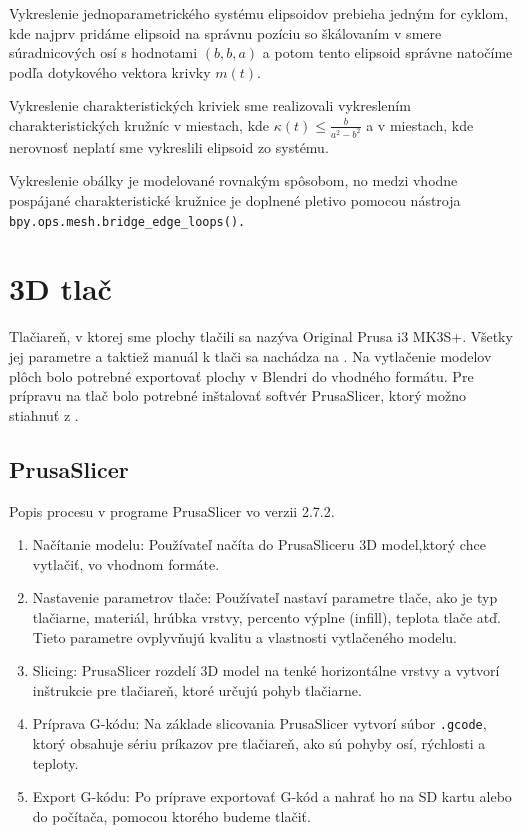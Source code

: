 Vykreslenie jednoparametrického systému elipsoidov prebieha jedným for cyklom, kde najprv pridáme elipsoid na správnu pozíciu so škálovaním v smere súradnicových osí s hodnotami $(b, b, a)$ a potom tento elipsoid správne natočíme podľa dotykového vektora krivky $m(t).$  

Vykreslenie charakteristických kriviek sme realizovali vykreslením charakteristických kružníc v miestach, kde
$\kappa(t) \leq \frac{b}{a^2-b^2}$ a v miestach, kde nerovnosť neplatí sme vykreslili elipsoid zo systému.

Vykreslenie obálky je modelované rovnakým spôsobom, no medzi vhodne pospájané charakteristické kružnice je doplnené pletivo pomocou nástroja \verb|bpy.ops.mesh.bridge_edge_loops().|  

\section{3D tlač}
Tlačiareň, v ktorej sme plochy tlačili sa nazýva Original Prusa i3 MK3S+. Všetky jej parametre a taktiež manuál k tlači sa nachádza na \cite{PrusaManual}. Na vytlačenie modelov plôch bolo potrebné exportovať plochy v Blendri do vhodného formátu. Pre prípravu na tlač bolo potrebné inštalovať softvér PrusaSlicer, ktorý možno stiahnuť z \cite{PrusaSlicer}.
\subsection{PrusaSlicer}
Popis procesu v programe PrusaSlicer vo verzii 2.7.2.
\begin{enumerate}
\item Načítanie modelu: Používateľ načíta do PrusaSliceru 3D model,ktorý chce vytlačiť, vo vhodnom formáte.

\item Nastavenie parametrov tlače: Používateľ nastaví parametre tlače, ako je typ tlačiarne, materiál, hrúbka vrstvy, percento výplne (infill), teplota tlače atď. Tieto parametre ovplyvňujú kvalitu a vlastnosti vytlačeného modelu.

\item Slicing: PrusaSlicer rozdelí 3D model na tenké horizontálne vrstvy a vytvorí inštrukcie pre tlačiareň, ktoré určujú pohyb tlačiarne. 

\item Príprava G-kódu: Na základe slicovania PrusaSlicer vytvorí súbor \verb|.gcode|, ktorý obsahuje sériu príkazov pre tlačiareň, ako sú pohyby osí, rýchlosti a teploty.

\item Export G-kódu: Po príprave exportovať G-kód a nahrať ho na SD kartu alebo do počítača, pomocou ktorého budeme tlačiť.
\end{enumerate}

